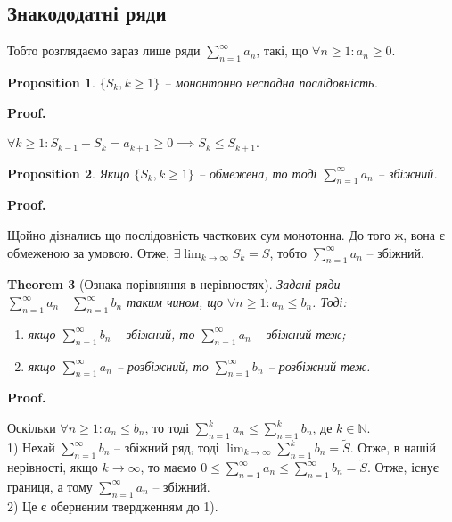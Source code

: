 \documentclass[a4paper, 10pt]{article}
\makeatletter
\def\huge{\displaystyle}
\theoremstyle{theoremdd}
\newtheorem{theorem}{Theorem}[subsection]
\theoremstyle{theoremdd}
\theoremstyle{theoremdd}
\theoremstyle{theoremdd}
\theoremstyle{theoremdd}
\theoremstyle{theoremdd}
\newtheorem{proposition}[theorem]{Proposition}
\theoremstyle{theoremdd}
\theoremstyle{theoremdd}
\theoremstyle{theoremdd}
\renewenvironment{proof}[1][Proof.\\]{\par
\pushQED{\hfill \qed}%
\normalfont \topsep6\p@\@plus6\p@\relax
\trivlist
\item\relax
{\bfseries
#1\@addpunct{.}}\hspace\labelsep\ignorespaces
}{%
\popQED\endtrivlist\@endpefalse
}
\makeatother
\begin{document}
\subsection{Знакододатні ряди}
Тобто розглядаємо зараз лише ряди $\huge \sum_{n=1}^{\infty} a_n$, такі, що $\forall n \geq 1: a_n \geq 0$.

\begin{proposition}
$\{S_k, k \geq 1\}$ -- мононтонно неспадна послідовність.
\end{proposition}

\begin{proof}
$\forall k \geq 1: S_{k-1} - S_k = a_{k+1} \geq 0 \implies S_{k} \leq S_{k+1}$.
\end{proof}

\begin{proposition}
Якщо $\{S_k, k \geq 1\}$ -- обмежена, то тоді $\huge \sum_{n=1}^{\infty} a_n$ -- збіжний.
\end{proposition}

\begin{proof}
Щойно дізнались що послідовність часткових сум монотонна. До того ж, вона є обмеженою за умовою. Отже, $\exists \huge \lim_{k \to \infty} S_k = S$, тобто  $\huge \sum_{n=1}^{\infty} a_n$ -- збіжний.
\end{proof}

\begin{theorem}[Ознака порівняння в нерівностях]
Задані ряди $\huge \sum_{n=1}^{\infty} a_n \quad \sum_{n=1}^{\infty} b_n$ таким чином, що $\forall n \geq 1: a_n \leq b_n$. Тоді:
\begin{enumerate}[nosep,wide=0pt,label={\arabic*)}]
\item якщо $\huge \sum_{n=1}^{\infty} b_n$ -- збіжний, то $\huge \sum_{n=1}^{\infty} a_n$ -- збіжний теж;
\item якщо $\huge \sum_{n=1}^{\infty} a_n$ -- розбіжний, то $\huge \sum_{n=1}^{\infty} b_n$ -- розбіжний теж.
\end{enumerate}
\end{theorem}

\begin{proof}
Оскільки $\forall n \geq 1: a_n \leq b_n$, то тоді $\huge \sum_{n=1}^k a_n \leq \sum_{n=1}^k b_n$, де $k \in \mathbb{N}$.\\
1) Нехай $\huge \sum_{n=1}^\infty b_n$ -- збіжний ряд, тоді $\huge\lim_{k \to \infty} \sum_{n=1}^k b_n = \tilde{S}$. Отже, в нашій нерівності, якщо $k \to \infty$, то маємо $0 \leq \huge\sum_{n=1}^\infty a_n \leq \sum_{n=1}^\infty b_n = \tilde{S}$. Отже, існує границя, а тому $\huge \sum_{n=1}^\infty a_n$ -- збіжний.\\
2) Це є оберненим твердженням до 1).
\end{proof}
\end{document}
